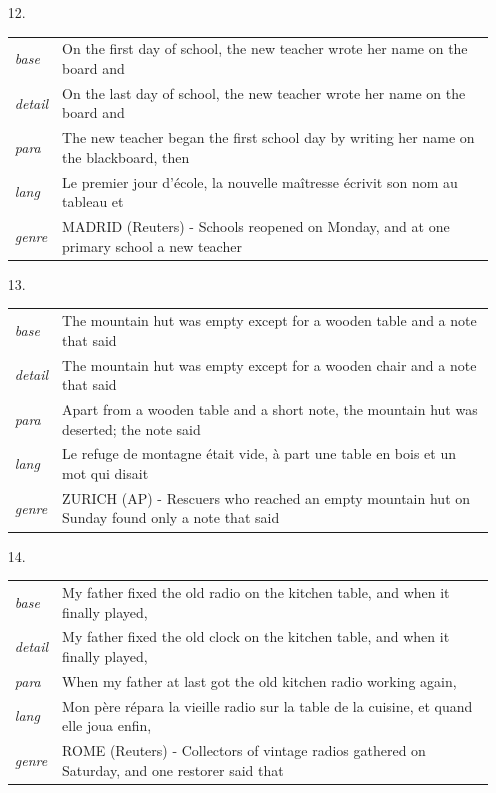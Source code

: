 \documentclass[11pt]{article}
\theoremstyle{definition}
\theoremstyle{remark}
\begin{document}
{\begin{itemize}
\item[12.] \begin{tabular}[t]{@{}ll@{}}\emph{base} & \parbox[t]{0.78\linewidth}{On the first day of school, the new teacher wrote her name on the board and}\\\emph{detail} & \parbox[t]{0.78\linewidth}{On the last day of school, the new teacher wrote her name on the board and}\\\emph{para} & \parbox[t]{0.78\linewidth}{The new teacher began the first school day by writing her name on the blackboard, then}\\\emph{lang} & \parbox[t]{0.78\linewidth}{Le premier jour d'école, la nouvelle maîtresse écrivit son nom au tableau et}\\\emph{genre} & \parbox[t]{0.78\linewidth}{MADRID (Reuters) - Schools reopened on Monday, and at one primary school a new teacher}\\\end{tabular}
\item[13.] \begin{tabular}[t]{@{}ll@{}}\emph{base} & \parbox[t]{0.78\linewidth}{The mountain hut was empty except for a wooden table and a note that said}\\\emph{detail} & \parbox[t]{0.78\linewidth}{The mountain hut was empty except for a wooden chair and a note that said}\\\emph{para} & \parbox[t]{0.78\linewidth}{Apart from a wooden table and a short note, the mountain hut was deserted; the note said}\\\emph{lang} & \parbox[t]{0.78\linewidth}{Le refuge de montagne était vide, à part une table en bois et un mot qui disait}\\\emph{genre} & \parbox[t]{0.78\linewidth}{ZURICH (AP) - Rescuers who reached an empty mountain hut on Sunday found only a note that said}\\\end{tabular}
\item[14.] \begin{tabular}[t]{@{}ll@{}}\emph{base} & \parbox[t]{0.78\linewidth}{My father fixed the old radio on the kitchen table, and when it finally played,}\\\emph{detail} & \parbox[t]{0.78\linewidth}{My father fixed the old clock on the kitchen table, and when it finally played,}\\\emph{para} & \parbox[t]{0.78\linewidth}{When my father at last got the old kitchen radio working again,}\\\emph{lang} & \parbox[t]{0.78\linewidth}{Mon père répara la vieille radio sur la table de la cuisine, et quand elle joua enfin,}\\\emph{genre} & \parbox[t]{0.78\linewidth}{ROME (Reuters) - Collectors of vintage radios gathered on Saturday, and one restorer said that}\\\end{tabular}

\end{itemize}}
\end{document}
